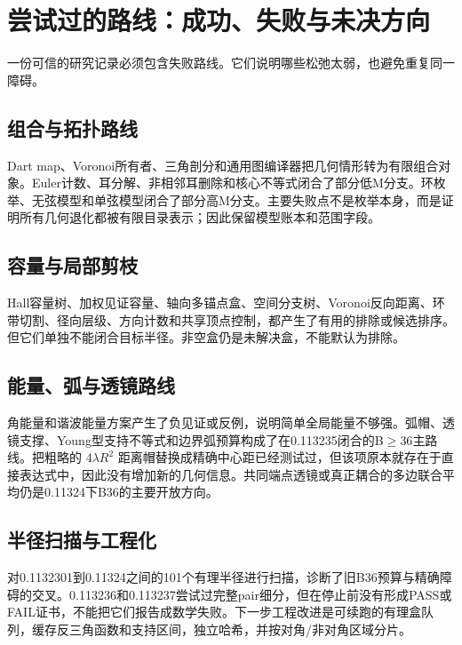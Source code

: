\section{尝试过的路线：成功、失败与未决方向}
一份可信的研究记录必须包含失败路线。它们说明哪些松弛太弱，也避免重复同一障碍。

\subsection{组合与拓扑路线}
Dart map、Voronoi所有者、三角剖分和通用图编译器把几何情形转为有限组合对象。Euler计数、耳分解、非相邻耳删除和核心不等式闭合了部分低M分支。环枚举、无弦模型和单弦模型闭合了部分高M分支。主要失败点不是枚举本身，而是证明所有几何退化都被有限目录表示；因此保留模型账本和范围字段。

\subsection{容量与局部剪枝}
Hall容量树、加权见证容量、轴向多锚点盒、空间分支树、Voronoi反向距离、环带切割、径向层级、方向计数和共享顶点控制，都产生了有用的排除或候选排序。但它们单独不能闭合目标半径。非空盒仍是未解决盒，不能默认为排除。

\subsection{能量、弧与透镜路线}
角能量和谐波能量方案产生了负见证或反例，说明简单全局能量不够强。弧帽、透镜支撑、Young型支持不等式和边界弧预算构成了在0.113235闭合的B$\ge36$主路线。把粗略的 $4\lambda R^2$ 距离帽替换成精确中心距已经测试过，但该项原本就存在于直接表达式中，因此没有增加新的几何信息。共同端点透镜或真正耦合的多边联合平均仍是0.11324下B36的主要开放方向。

\subsection{半径扫描与工程化}
对0.1132301到0.11324之间的101个有理半径进行扫描，诊断了旧B36预算与精确障碍的交叉。0.113236和0.113237尝试过完整pair细分，但在停止前没有形成PASS或FAIL证书，不能把它们报告成数学失败。下一步工程改进是可续跑的有理盒队列，缓存反三角函数和支持区间，独立哈希，并按对角/非对角区域分片。

